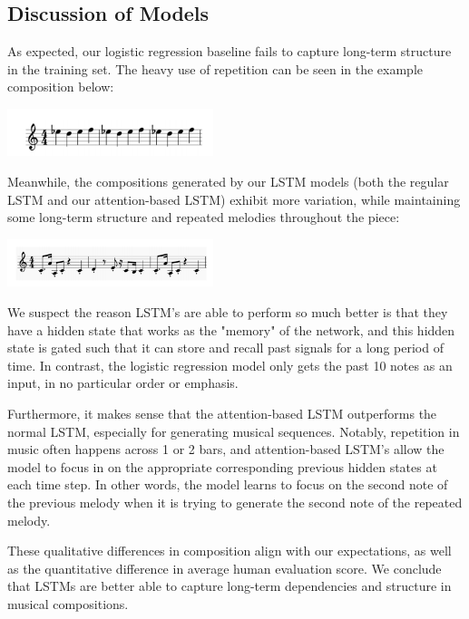 \documentclass[twoside,twocolumn]{article}
\begin{document}
\subsection{Discussion of Models}

As expected, our logistic regression baseline fails to capture long-term
structure in the training set. The heavy use of repetition can be seen in the example composition below:

\includegraphics[width = 0.45\textwidth]{images/logreg_composition.png}

Meanwhile, the compositions generated by our LSTM models (both the regular LSTM and our attention-based LSTM) exhibit more
variation, while maintaining some long-term structure and repeated
melodies throughout the piece:

\includegraphics[width = 0.45\textwidth]{images/magenta_composition.png}

We suspect the reason LSTM's are able to perform so much better is that they have a hidden state that works as the "memory" of the network, and this hidden state is gated such that it can store and recall past signals for a long period of time. In contrast, the logistic regression model only gets the past 10 notes as an input, in no particular order or emphasis.

Furthermore, it makes sense that the attention-based LSTM outperforms the normal LSTM, especially for generating musical sequences. Notably, repetition in music often happens across 1 or 2 bars, and attention-based LSTM's allow the model to focus in on the appropriate corresponding previous hidden states at each time step. In other words, the model learns to focus on the second note of the previous melody when it is trying to generate the second note of the repeated melody.

These qualitative differences in composition align with our expectations, as well as the quantitative difference in average human
evaluation score. We conclude that LSTMs are better able to capture long-term dependencies and structure in musical compositions.


\end{document}
